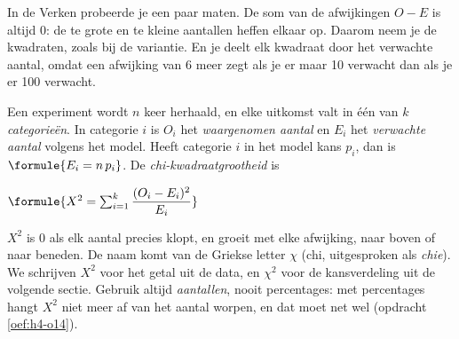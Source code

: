 In de Verken probeerde je een paar maten. De som van de afwijkingen $O - E$ is altijd 0: de te grote en te kleine aantallen heffen elkaar op. Daarom neem je de kwadraten, zoals bij de variantie. En je deelt elk kwadraat door het verwachte aantal, omdat een afwijking van 6 meer zegt als je er maar 10 verwacht dan als je er 100 verwacht.

\begin{theorie}
Een experiment wordt $n$ keer herhaald, en elke uitkomst valt in één van $k$ \emph{categorieën}. In categorie $i$ is $O_i$ het \emph{waargenomen aantal} en $E_i$ het \emph{verwachte aantal} volgens het model. Heeft categorie $i$ in het model kans $p_i$, dan is $\formule{E_i = n\,p_i}$. De \emph{chi-kwadraatgrootheid} is

\vspace{1mm}
\qquad $\formule{X^2 = \sum_{i=1}^{k} \dfrac{(O_i - E_i)^2}{E_i}}$
\end{theorie}

$X^2$ is 0 als elk aantal precies klopt, en groeit met elke afwijking, naar boven of naar beneden. De naam komt van de Griekse letter $\chi$ (chi, uitgesproken als \textit{chie}). We schrijven $X^2$ voor het getal uit de data, en $\chi^2$ voor de kansverdeling uit de volgende sectie. Gebruik altijd \textit{aantallen}, nooit percentages: met percentages hangt $X^2$ niet meer af van het aantal worpen, en dat moet net wel (opdracht \ref{oef:h4-o14}).


